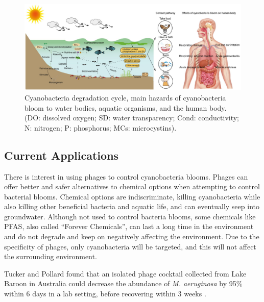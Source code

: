 \begin{figure}
    \centering
    \includegraphics[width=0.75\linewidth]{Figures/cyanobacteria_bloom_cycle.png} 
    \caption{Cyanobacteria degradation cycle, main hazards of cyanobacteria bloom to water bodies, aquatic organisms, and the human body. (DO: dissolved oxygen; SD: water transparency; Cond: conductivity; N: nitrogen; P: phosphorus; MCs: microcystins). \cite{zhangImpactCyanobacteriaBlooms2022}}
    \label{fig:cyanobacteria_bloom_cycle}
\end{figure}

\subsection{Current Applications}
 There is interest in using phages to control cyanobacteria blooms.
Phages can offer better and safer alternatives to chemical options when attempting to control bacterial blooms.
Chemical options are indiscriminate, killing cyanobacteria while also killing other beneficial bacteria and aquatic life, and can eventually seep into groundwater.
Although not used to control bacteria blooms, some chemicals like PFAS, also called “Forever Chemicals”, can last a long time in the environment and do not degrade and keep on negatively affecting the environment.
Due to the specificity of phages, only cyanobacteria will be targeted, and this will not affect the surrounding environment. 

Tucker and Pollard found that an isolated phage cocktail collected from Lake Baroon in Australia could decrease the abundance of \textit{M. aeruginosa} by 95\% within 6 days in a lab setting, before recovering within 3 weeks \cite{tuckerIdentificationCyanophageMaLBP2005}. 

